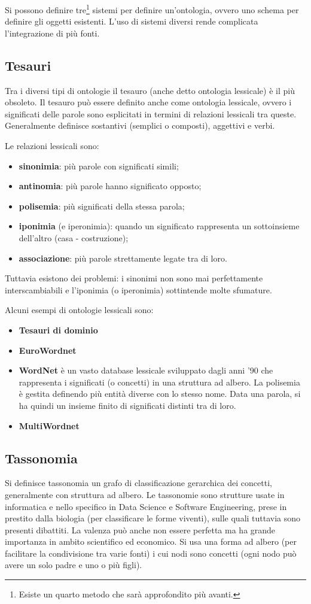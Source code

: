 \documentclass[11pt]{article}
\begin{document}
Si possono definire tre\footnote{Esiste un quarto metodo che sarà approfondito più avanti.} sistemi per definire un'ontologia, ovvero uno schema per definire gli oggetti esistenti. L'uso di sistemi diversi rende complicata l'integrazione di più fonti.

\subsection{Tesauri}
Tra i diversi tipi di ontologie il tesauro (anche detto ontologia lessicale) è il più obsoleto. Il tesauro può essere definito anche come ontologia lessicale, ovvero i significati delle parole sono esplicitati in termini di relazioni lessicali tra queste.
Generalmente definisce sostantivi (semplici o composti), aggettivi e verbi.

Le relazioni lessicali sono:
\begin{itemize}
  \item \textbf{sinonimia}: più parole con significati simili;
  \item \textbf{antinomia}: più parole hanno significato opposto;
  \item \textbf{polisemia}: più significati della stessa parola;
  \item \textbf{iponimia} (e iperonimia): quando un significato rappresenta un sottoinsieme dell'altro (casa - costruzione);
  \item \textbf{associazione}: più parole strettamente legate tra di loro.
\end{itemize}
Tuttavia esistono dei problemi: i sinonimi non sono mai perfettamente interscambiabili e l'iponimia (o iperonimia) sottintende molte sfumature.

Alcuni esempi di ontologie lessicali sono:
\begin{itemize}
\item \textbf{Tesauri di dominio}
\item \textbf{EuroWordnet}
\item \textbf{WordNet} è un vasto database lessicale sviluppato dagli anni '90 che rappresenta i significati (o concetti) in una struttura ad albero. La polisemia è gestita definendo più entità diverse con lo stesso nome. Data una parola, si ha quindi un insieme finito di significati distinti tra di loro.
\item \textbf{MultiWordnet}
\end{itemize}
\subsection{Tassonomia}
Si definisce tassonomia un grafo di classificazione gerarchica dei concetti, generalmente con struttura ad albero.
Le tassonomie sono strutture usate in informatica e nello specifico in Data Science e Software Engineering, prese in prestito dalla biologia (per classificare le forme viventi), sulle quali tuttavia sono presenti dibattiti.
La valenza può anche non essere perfetta ma ha grande importanza in ambito scientifico ed economico.
Si usa una forma ad albero (per facilitare la condivisione tra varie fonti) i cui nodi sono concetti (ogni nodo può avere un solo padre e uno o più figli).
\end{document}
